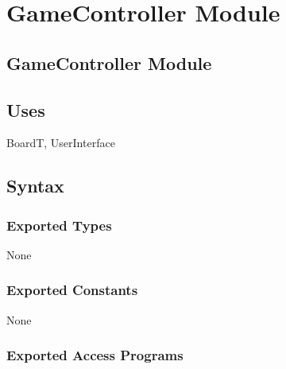 \documentclass[12pt]{article}
\begin{document}
\section* {GameController Module}

\subsection* {GameController Module}

\subsection* {Uses}

BoardT, UserInterface

\subsection* {Syntax}

\subsubsection* {Exported Types}

None

\subsubsection* {Exported Constants}

None

\subsubsection* {Exported Access Programs}
\end{document}
